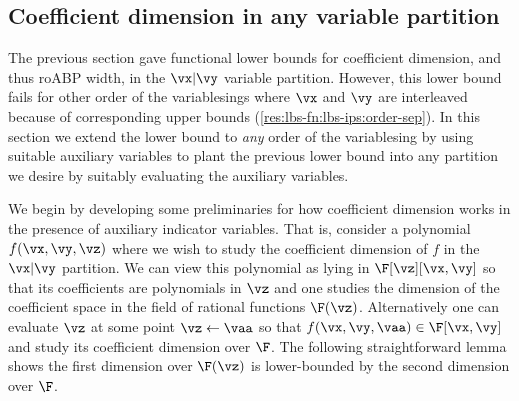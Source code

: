 \documentclass[11pt]{article}
\numberwithin{equation}{section}
\theoremstyle{definition}
\theoremstyle{plain}
\begin{document}
\subsection{Coefficient dimension in any variable partition}\label{sec:lbs-fn:every-partition}

The previous section gave functional lower bounds for coefficient dimension, and thus roABP width, in the $\vx|\vy$ variable partition. However, this lower bound fails for other order of the variablesings where $\vx$ and $\vy$ are interleaved because of corresponding upper bounds (\autoref{res:lbs-fn:lbs-ips:order-sep}). In this section we extend the lower bound to \emph{any} order of the variablesing by using suitable auxiliary variables to plant the previous lower bound into any partition we desire by suitably evaluating the auxiliary variables.

We begin by developing some preliminaries for how coefficient dimension works in the presence of auxiliary indicator variables.  That is, consider a polynomial $f(\vx,\vy,\vz)$ where we wish to study the coefficient dimension of $f$ in the $\vx|\vy$ partition. We can view this polynomial as lying in $\F[\vz][\vx,\vy]$ so that its coefficients are polynomials in $\vz$ and one studies the dimension of the coefficient space in the field of rational functions $\F(\vz)$.  Alternatively one can evaluate $\vz$ at some point $\vz\leftarrow\vaa$ so that $f(\vx,\vy,\vaa)\in\F[\vx,\vy]$ and study its coefficient dimension over $\F$.  The following straightforward lemma shows the first dimension over $\F(\vz)$ is lower-bounded by the second dimension over $\F$.
\end{document}
